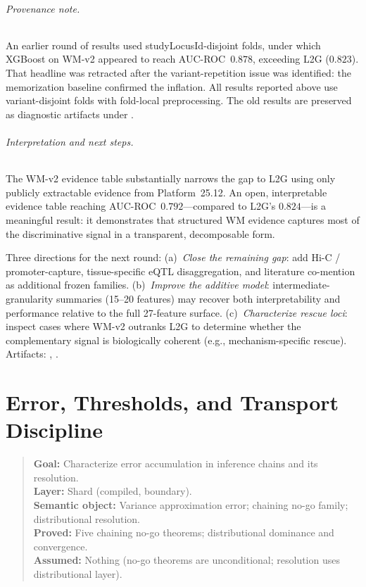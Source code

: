 \documentclass[11pt,openany]{report}
\begin{document}
\subparagraph{Provenance note.}
An earlier round of results used studyLocusId-disjoint folds, under
which XGBoost on WM-v2 appeared to reach AUC-ROC~$0.878$, exceeding
L2G ($0.823$).  That headline was retracted after the variant-repetition
issue was identified: the memorization baseline confirmed the inflation.
All results reported above use variant-disjoint folds with fold-local
preprocessing.  The old results are preserved as diagnostic artifacts
under .

\subparagraph{Interpretation and next steps.}
The WM-v2 evidence table substantially narrows the gap to L2G using
only publicly extractable evidence from Platform~25.12.  An open,
interpretable evidence table reaching AUC-ROC~$0.792$---compared to
L2G's $0.824$---is a meaningful result: it demonstrates that
structured WM evidence captures most of the discriminative signal
in a transparent, decomposable form.

Three directions for the next round:
(a)~\emph{Close the remaining gap}: add Hi-C / promoter-capture,
  tissue-specific eQTL disaggregation, and literature co-mention
  as additional frozen families.
(b)~\emph{Improve the additive model}: intermediate-granularity
  summaries (15--20 features) may recover both interpretability and
  performance relative to the full 27-feature surface.
(c)~\emph{Characterize rescue loci}: inspect cases where WM-v2
  outranks L2G to determine whether the complementary signal is
  biologically coherent (e.g., mechanism-specific rescue).
Artifacts: ,
.

\chapter{Error, Thresholds, and Transport Discipline}
\label{ch:error-transport}

\begin{quote}\small
\textbf{Goal:} Characterize error accumulation in inference chains and its resolution.\\
\textbf{Layer:} Shard (compiled, boundary).\\
\textbf{Semantic object:} Variance approximation error; chaining no-go family; distributional resolution.\\
\textbf{Proved:} Five chaining no-go theorems; distributional dominance and convergence.\\
\textbf{Assumed:} Nothing (no-go theorems are unconditional; resolution uses distributional layer).
\end{quote}
\end{document}
